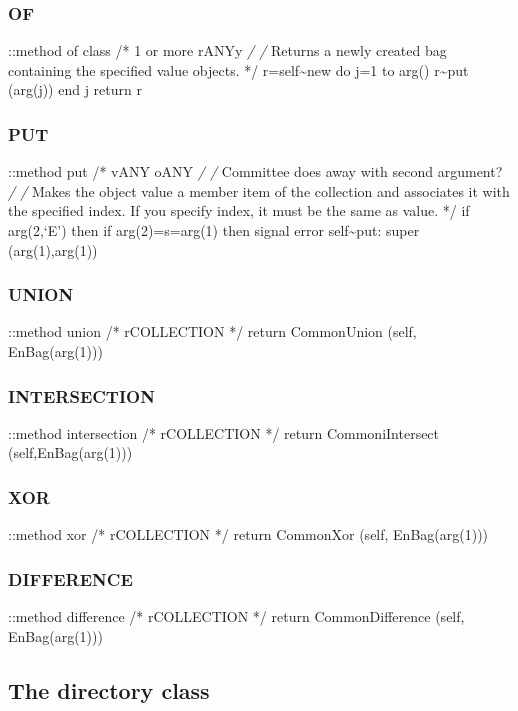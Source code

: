\subsubsection{OF}\label{of-2}

::method of class /* 1 or more rANYy \emph{/ /} Returns a newly created
bag containing the specified value objects. */ r=self\textasciitilde new
do j=1 to arg() r\textasciitilde put (arg(j)) end j return r

\subsubsection{PUT}\label{put-4}

::method put /* vANY oANY \emph{/ /} Committee does away with second
argument? \emph{/ /} Makes the object value a member item of the
collection and associates it with the specified index. If you specify
index, it must be the same as value. */ if arg(2,`E') then if
arg(2)=s=arg(1) then signal error self\textasciitilde put: super
(arg(1),arg(1))

\subsubsection{UNION}\label{union-2}

::method union /* rCOLLECTION */ return CommonUnion (self,
EnBag(arg(1)))

\subsubsection{INTERSECTION}\label{intersection-3}

::method intersection /* rCOLLECTION */ return CommoniIntersect
(self,EnBag(arg(1)))

\subsubsection{XOR}\label{xor-3}

::method xor /* rCOLLECTION */ return CommonXor (self, EnBag(arg(1)))

\subsubsection{DIFFERENCE}\label{difference-3}

::method difference /* rCOLLECTION */ return CommonDifference (self,
EnBag(arg(1)))

\subsection{The directory class}\label{the-directory-class}

